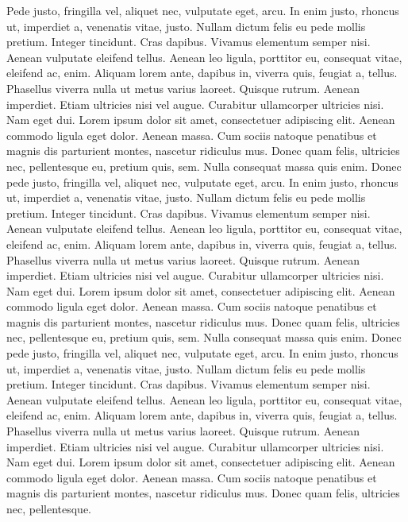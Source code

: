 \documentclass[
    12pt,
    letterpaper,
    oneside,
    noraggedright
]{turabian-researchpaper}
\begin{document}
Pede justo, fringilla vel, aliquet nec, vulputate eget, arcu. In enim
justo, rhoncus ut, imperdiet a, venenatis vitae, justo. Nullam dictum
felis eu pede mollis pretium. Integer tincidunt. Cras dapibus. Vivamus
elementum semper nisi. Aenean vulputate eleifend tellus. Aenean leo
ligula, porttitor eu, consequat vitae, eleifend ac, enim. Aliquam lorem
ante, dapibus in, viverra quis, feugiat a, tellus. Phasellus viverra
nulla ut metus varius laoreet. Quisque rutrum. Aenean imperdiet. Etiam
ultricies nisi vel augue. Curabitur ullamcorper ultricies nisi. Nam eget
dui. Lorem ipsum dolor sit amet, consectetuer adipiscing elit. Aenean
commodo ligula eget dolor. Aenean massa. Cum sociis natoque penatibus et
magnis dis parturient montes, nascetur ridiculus mus. Donec quam felis,
ultricies nec, pellentesque eu, pretium quis, sem. Nulla consequat massa
quis enim. Donec pede justo, fringilla vel, aliquet nec, vulputate eget,
arcu. In enim justo, rhoncus ut, imperdiet a, venenatis vitae, justo.
Nullam dictum felis eu pede mollis pretium. Integer tincidunt. Cras
dapibus. Vivamus elementum semper nisi. Aenean vulputate eleifend
tellus. Aenean leo ligula, porttitor eu, consequat vitae, eleifend ac,
enim. Aliquam lorem ante, dapibus in, viverra quis, feugiat a, tellus.
Phasellus viverra nulla ut metus varius laoreet. Quisque rutrum. Aenean
imperdiet. Etiam ultricies nisi vel augue. Curabitur ullamcorper
ultricies nisi. Nam eget dui. Lorem ipsum dolor sit amet, consectetuer
adipiscing elit. Aenean commodo ligula eget dolor. Aenean massa. Cum
sociis natoque penatibus et magnis dis parturient montes, nascetur
ridiculus mus. Donec quam felis, ultricies nec, pellentesque eu, pretium
quis, sem. Nulla consequat massa quis enim. Donec pede justo, fringilla
vel, aliquet nec, vulputate eget, arcu. In enim justo, rhoncus ut,
imperdiet a, venenatis vitae, justo. Nullam dictum felis eu pede mollis
pretium. Integer tincidunt. Cras dapibus. Vivamus elementum semper nisi.
Aenean vulputate eleifend tellus. Aenean leo ligula, porttitor eu,
consequat vitae, eleifend ac, enim. Aliquam lorem ante, dapibus in,
viverra quis, feugiat a, tellus. Phasellus viverra nulla ut metus varius
laoreet. Quisque rutrum. Aenean imperdiet. Etiam ultricies nisi vel
augue. Curabitur ullamcorper ultricies nisi. Nam eget dui. Lorem ipsum
dolor sit amet, consectetuer adipiscing elit. Aenean commodo ligula eget
dolor. Aenean massa. Cum sociis natoque penatibus et magnis dis
parturient montes, nascetur ridiculus mus. Donec quam felis, ultricies
nec, pellentesque.
\end{document}
